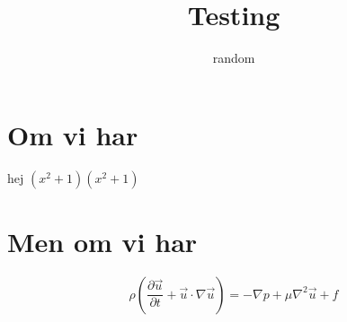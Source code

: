 \documentclass[12pt]{report}
\author{random}
\begin{document}
\title{Testing}
\maketitle
\section{Om vi har}
hej
$(x^2+1)(x^2+1)$
\section{Men om vi har}
$$
\rho(\frac{\partial \vec{u}}{\partial t} + \vec{u}\cdot\nabla \vec{u})
= 
-\nabla p + \mu\nabla^2 \vec{u} + f
$$
\end{document}
